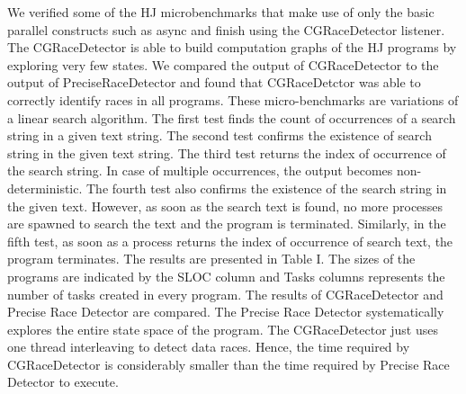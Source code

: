 We verified some of the HJ microbenchmarks that make use of only the basic parallel constructs such as async and finish using the CGRaceDetector listener. The CGRaceDetector is able to build computation graphs of the HJ programs by exploring very few states. We compared the output of CGRaceDetector to the output of PreciseRaceDetector and found that CGRaceDetctor was able to correctly identify races in all programs. These micro-benchmarks are variations of a linear search algorithm. The first test finds the count of occurrences of a search string in a given text string. The second test confirms the existence of search string in the given text string. The third test returns the index of occurrence of the search string. In case of multiple occurrences, the output becomes non-deterministic. The fourth test also confirms the existence of the search string in the given text. However, as soon as the search text is found, no more processes are spawned to search the text and the program is terminated. Similarly, in the fifth test, as soon as a process returns the index of occurrence of search text, the program terminates. The results are presented in Table I. The sizes of the programs are indicated by the SLOC column and Tasks columns represents the number of tasks created in every program. The results of CGRaceDetector and Precise Race Detector are compared. The Precise Race Detector systematically explores the entire state space of the program. The CGRaceDetector just uses one thread interleaving to detect data races. Hence, the time required by CGRaceDetector is considerably smaller than the time required by Precise Race Detector to execute.


